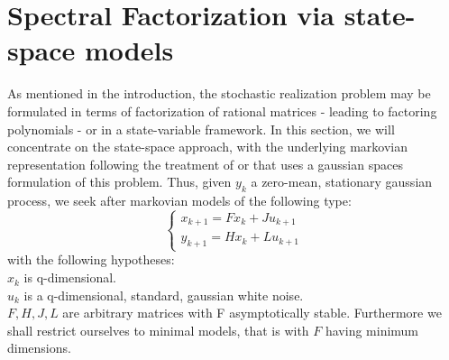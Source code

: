 \section{Spectral Factorization via state-space models}
\label{ricca}
As mentioned in the introduction, the stochastic realization 
problem may be formulated in terms
of factorization of rational matrices - leading to factoring polynomials -
 or in a state-variable framework. In this section, we will concentrate 
on the state-space approach, with the underlying
markovian representation following the treatment of \cite{ruckebusch} or that uses 
a gaussian spaces formulation of this problem.
Thus, given $y_k$ a zero-mean, stationary gaussian process, 
we seek after markovian models of the following type:
\begin{equation}
\left\{ \begin{array}{ll}
x_{k+1}=Fx_k + Ju_{k+1}\\
y_{k+1}=Hx_k + Lu_{k+1} 
\end{array} \right. 
\label{e.ricc.4}
\end{equation}
with the following hypotheses:\\
$x_k$ is q-dimensional.\\
$u_k$ is a q-dimensional, standard, gaussian white noise.\\
$F, H, J, L$ are arbitrary matrices with F asymptotically stable.
Furthermore we shall restrict ourselves to minimal models, that is with 
$F$ having minimum dimensions. 

